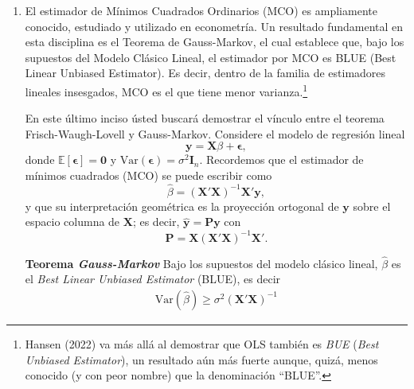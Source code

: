 \documentclass[a4paper, answers, addpoints, 11pt]{exam}
\begin{document}
\begin{enumerate}
    \begin{equation}
        \hat\beta_2 = (\boldsymbol{\Tilde{X}_2'}\boldsymbol{\Tilde{X}_2})^{-1}\boldsymbol{\Tilde{X}_2'}\textbf{y}.
    \end{equation}

    Note que $\boldsymbol{\Tilde{y}} \neq \textbf{y}$, pues la primera es afectada por la matriz de aniquilación $M_1$ y la segunda es el vector de la variable independiente sin ninguna alteración. ¿Cuál es la diferencia entre el resultado que obtuvo en el inciso 4. vs el de este inciso?


    \item El estimador de Mínimos Cuadrados Ordinarios (MCO) es ampliamente conocido, estudiado y utilizado en econometría. Un resultado fundamental en esta disciplina es el Teorema de Gauss-Markov, el cual establece que, bajo los supuestos del Modelo Clásico Lineal, el estimador por MCO es BLUE (Best Linear Unbiased Estimator). Es decir, dentro de la familia de estimadores lineales insesgados, MCO es el que tiene menor varianza.\footnote{Hansen (2022) va más allá al demostrar que OLS también es \textit{BUE} (\textit{Best Unbiased Estimator}), un resultado aún más fuerte aunque, quizá, menos conocido (y con peor nombre) que la denominación ``BLUE''.}  
    
    En este último inciso ústed buscará demostrar el vínculo entre el teorema Frisch-Waugh-Lovell y Gauss-Markov. Considere el modelo de regresión lineal
\begin{equation}\label{EQ:modeloGM}
    \mathbf{y} = \mathbf{X}\beta + \boldsymbol\epsilon,
\end{equation}
donde \(\mathbb{E}[\boldsymbol\epsilon] = \mathbf{0}\) y \(\mathrm{Var}(\boldsymbol\epsilon)=\sigma^2 \mathbf{I}_n\). Recordemos que el estimador de mínimos cuadrados (MCO) se puede escribir como
\[
\hat{\beta} = (\mathbf{X}'\mathbf{X})^{-1}\mathbf{X}'\mathbf{y},
\]
y que su interpretación geométrica es la proyección ortogonal de \(\mathbf{y}\) sobre el espacio columna de \(\mathbf{X}\); es decir, \(\hat{\mathbf{y}} = \mathbf{P}\mathbf{y}\) con
\[
\mathbf{P} = \mathbf{X}(\mathbf{X}'\mathbf{X})^{-1}\mathbf{X}'.
\]

\begin{mdframed}
\textbf{Teorema \textit{Gauss-Markov}}
Bajo los supuestos del modelo clásico lineal, \(\hat{\beta}\) es el \emph{Best Linear Unbiased Estimator} (BLUE), es decir
\begin{align}
   \text{Var}(\hat{\beta}) \geq \sigma^2 (\mathbf{X}' \mathbf{X})^{-1}    \tag{Gauss-Markov}
\end{align}
\end{mdframed}


\end{enumerate}
\end{document}
